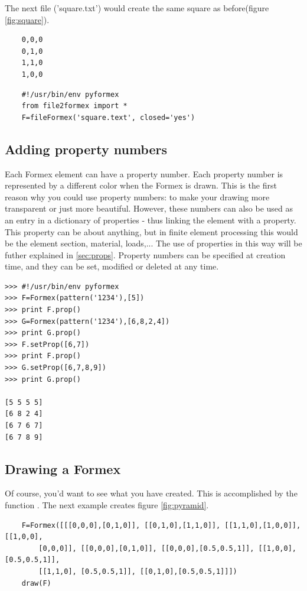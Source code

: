 The next file ('square.txt') would create the same square as before(figure \ref{fig:square}).
\begin{verbatim}
	0,0,0
	0,1,0
	1,1,0
	1,0,0
\end{verbatim}
\begin{verbatim}
	#!/usr/bin/env pyformex
	from file2formex import *
	F=fileFormex('square.text', closed='yes')
\end{verbatim}

\subsection{Adding property numbers}
\label{subsec:propnr}
Each Formex element can have a property number. Each property number is represented by a different color when the Formex is drawn. This is the first reason why you could use property numbers: to make your drawing more transparent or just more beautiful. However, these numbers can also be used as an entry in a dictionary of properties - thus linking the element with a property. This property can be about anything, but in finite element processing this would be the element section, material, loads,... The use of properties in this way will be futher explained in \ref{sec:props}.
Property numbers can be specified at creation time, and they can be set, modified or deleted at any time.  
\begin{verbatim}
>>> #!/usr/bin/env pyformex
>>> F=Formex(pattern('1234'),[5])
>>> print F.prop()
>>> G=Formex(pattern('1234'),[6,8,2,4])
>>> print G.prop()
>>> F.setProp([6,7])
>>> print F.prop()
>>> G.setProp([6,7,8,9])
>>> print G.prop()

[5 5 5 5]
[6 8 2 4]
[6 7 6 7]
[6 7 8 9]
\end{verbatim}

\subsection{Drawing a Formex}
\label{subsec:drawing}
Of course, you'd want to see what you have created. This is accomplished by the function . The next example creates figure \ref{fig:pyramid}. 
\begin{verbatim}
	F=Formex([[[0,0,0],[0,1,0]], [[0,1,0],[1,1,0]], [[1,1,0],[1,0,0]], [[1,0,0], 
		[0,0,0]], [[0,0,0],[0,1,0]], [[0,0,0],[0.5,0.5,1]], [[1,0,0],[0.5,0.5,1]], 
		[[1,1,0], [0.5,0.5,1]], [[0,1,0],[0.5,0.5,1]]])
	draw(F)
\end{verbatim}

